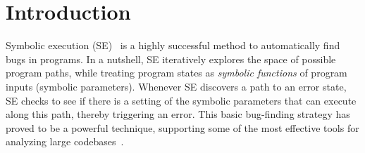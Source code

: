 \documentclass[acmsmall,review,anonymous]{acmart}\settopmatter{printfolios=true,printccs=false,printacmref=false}
\begin{document}





\maketitle


\section{Introduction}
\label{sec:intro}

Symbolic execution (SE)~\citep{king1976} is a highly successful method to
automatically find bugs in programs. In a nutshell, SE iteratively explores the
space of possible program paths, while treating program states as
\emph{symbolic functions} of program inputs (symbolic parameters). Whenever SE discovers a path to an error state, SE checks
to see if there is a setting of the symbolic parameters that can execute along
this path, thereby triggering an error. This basic bug-finding strategy has
proved to be a powerful technique, supporting some of the most effective tools
for analyzing large codebases~\citep{bessey_2010}.
\end{document}
